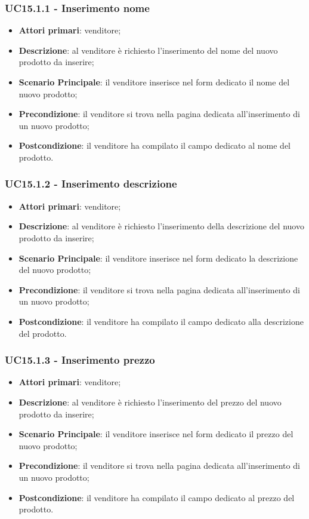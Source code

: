 \subsubsection{UC15.1.1 - Inserimento nome}
\begin{itemize}
\item \textbf{Attori primari}: venditore;
\item \textbf{Descrizione}: al venditore è richiesto l'inserimento del nome del nuovo prodotto da inserire;
\item \textbf{Scenario Principale}: il venditore inserisce nel form dedicato il nome del nuovo prodotto;
\item \textbf{Precondizione}: il venditore si trova nella pagina dedicata all'inserimento di un nuovo prodotto;
\item \textbf{Postcondizione}: il venditore ha compilato il campo dedicato al nome del prodotto.
\end{itemize}

\subsubsection{UC15.1.2 - Inserimento descrizione}
\begin{itemize}
\item \textbf{Attori primari}: venditore;
\item \textbf{Descrizione}: al venditore è richiesto l'inserimento della descrizione del nuovo prodotto da inserire;
\item \textbf{Scenario Principale}: il venditore inserisce nel form dedicato la descrizione del nuovo prodotto;
\item \textbf{Precondizione}: il venditore si trova nella pagina dedicata all'inserimento di un nuovo prodotto;
\item \textbf{Postcondizione}: il venditore ha compilato il campo dedicato alla descrizione del prodotto.
\end{itemize}

\subsubsection{UC15.1.3 - Inserimento prezzo}
\begin{itemize}
\item \textbf{Attori primari}: venditore;
\item \textbf{Descrizione}: al venditore è richiesto l'inserimento del prezzo del nuovo prodotto da inserire;
\item \textbf{Scenario Principale}: il venditore inserisce nel form dedicato il prezzo del nuovo prodotto;
\item \textbf{Precondizione}: il venditore si trova nella pagina dedicata all'inserimento di un nuovo prodotto;
\item \textbf{Postcondizione}: il venditore ha compilato il campo dedicato al prezzo del prodotto.
\end{itemize}

